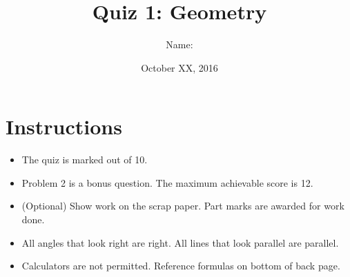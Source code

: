 \documentclass[12pt,letterpaper]{article}
\title{Quiz 1: Geometry}
\author{Name: \underline{\hspace{5cm}} \OutOf{10}}
\date{October XX, 2016}
\begin{document}
\newcommand*\circleletter[1]{%
  \begin{tikzpicture}[baseline=(C.base)]
    \node[draw,circle,inner sep=1pt](C) {#1};
  \end{tikzpicture}}

\maketitle

\thispagestyle{empty}

\section*{Instructions}
\begin{itemize}
  \item The quiz is marked out of 10.
  \item Problem 2 is a bonus question. The maximum achievable score is 12.
  \item (Optional) Show work on the scrap paper. Part marks are awarded for
  work done.
  \item All angles that look right are right. All lines that look parallel are
  parallel.
  \item Calculators are not permitted. Reference formulas on bottom of back
  page.
\end{itemize}
\end{document}
